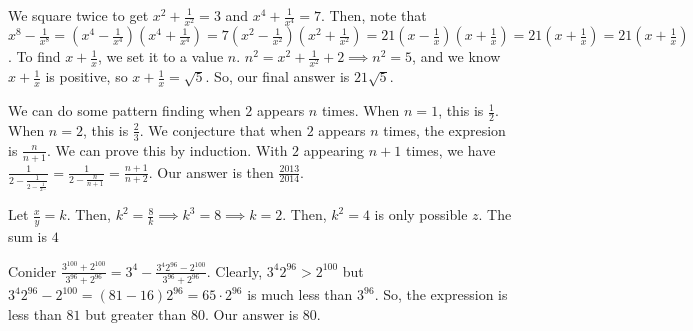\documentclass[11pt]{article}
\begin{document}

\begin{sol} 
We square twice to get $x^2+\frac{1}{x^2}=3$ and $x^4+\frac{1}{x^4}=7$. Then, note that $x^8-\frac{1}{x^8}=(x^4-\frac{1}{x^4})(x^4+\frac{1}{x^4})=7(x^2-\frac{1}{x^2})(x^2+\frac{1}{x^2})=21(x-\frac{1}{x})(x+\frac{1}{x})=21(x+\frac{1}{x})=21(x+\frac{1}{x})$. To find $x+\frac{1}{x}$, we set it to a value $n$. $n^2 = x^2 + \frac{1}{x^2} + 2 \implies n^2 = 5$, and we know $x+\frac{1}{x}$ is positive, so $x+\frac{1}{x} = \sqrt{5}$. So, our final answer is $\boxed{21\sqrt{5}}$.
\end{sol}



\begin{sol}
We can do some pattern finding when $2$ appears $n$ times. When $n=1$, this is $\frac{1}{2}$. When $n=2$, this is $\frac{2}{3}$. We conjecture that when $2$ appears $n$ times, the expresion is $\frac{n}{n+1}$. We can prove this by induction. With $2$ appearing $n+1$ times, we have $\frac{1}{2-\frac{1}{2-\frac{1}{2\cdots}}} = \frac{1}{2-\frac{n}{n+1}}=\frac{n+1}{n+2}$. Our answer is then $\boxed{\frac{2013}{2014}}$.
\end{sol}


\begin{sol} 
Let $\frac{x}{y}=k$. Then, $k^2=\frac{8}{k}\implies k^3 = 8\implies k =2$. Then, $k^2=4$ is only possible $z$. The sum is $\boxed{4}$ 
\end{sol}


\begin{sol}
Conider $\frac{3^{100}+2^{100}}{3^{96}+2^{96}}=3^4-\frac{3^{4}2^{96}-2^{100}}{3^{96}+2^{96}}$. Clearly, $3^{4}2^{96}>2^{100}$ but $3^{4}2^{96}-2^{100}=(81-16)2^{96}=65\cdot 2^{96}$ is much less than $3^{96}$. So, the expression is less than $81$ but greater than $80$. Our answer is $\boxed{80}$.
\end{sol}
\end{document}

